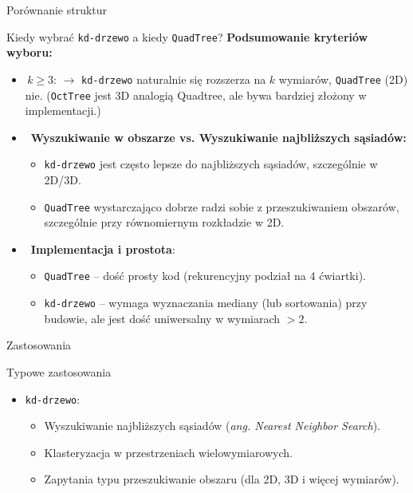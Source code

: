 \documentclass[aspectratio=1610, polish]{beamer}
\begin{document}
\begin{section}{Porównanie struktur}
\begin{frame}{Kiedy wybrać \texttt{kd-drzewo} a kiedy \texttt{QuadTree}?}
    \textbf{Podsumowanie kryteriów wyboru:}
    \begin{itemize}
        \item \(\,k\geq 3\):  
              \(\rightarrow\) \texttt{kd-drzewo} naturalnie się rozszerza na \(k\) wymiarów, \texttt{QuadTree} (2D) nie.  
              (\texttt{OctTree} jest 3D analogią Quadtree, ale bywa bardziej złożony w implementacji.)
        \item \(\,\) \textbf{Wyszukiwanie w obszarze vs. Wyszukiwanie najbliższych sąsiadów:}
            \begin{itemize}
                \item \texttt{kd-drzewo} jest często lepsze do najbliższych sąsiadów, szczególnie w 2D/3D.
                \item \texttt{QuadTree} wystarczająco dobrze radzi sobie z przeszukiwaniem obszarów, szczególnie przy równomiernym rozkładzie w 2D.
            \end{itemize}
        \item \(\,\) \textbf{Implementacja i prostota}:
            \begin{itemize}
                \item \texttt{QuadTree} – dość prosty kod (rekurencyjny podział na 4 ćwiartki).
                \item \texttt{kd-drzewo} – wymaga wyznaczania mediany (lub sortowania) przy budowie, ale jest dość uniwersalny w wymiarach \(>2\).
            \end{itemize}
    \end{itemize}
\end{frame}

\begin{frame}{Zastosowania}
    \begin{block}{Typowe zastosowania}
    \begin{itemize}
        \item \texttt{kd-drzewo}:
            \begin{itemize}
                \item Wyszukiwanie najbliższych sąsiadów (\emph{ang. Nearest Neighbor Search}).
                \item Klasteryzacja w przestrzeniach wielowymiarowych.
                \item Zapytania typu przeszukiwanie obszaru (dla 2D, 3D i więcej wymiarów).
            \end{itemize}
            

\end{itemize}
\end{block}
\end{frame}
\end{section}
\end{document}
